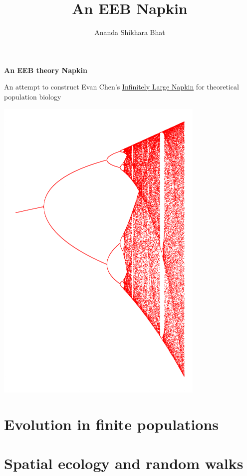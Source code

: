 \documentclass[12pt,twoside]{report}
\title{An EEB Napkin}
\author{Ananda Shikhara Bhat}
\begin{document}
	\begin{titlepage}
		\begin{center}
			\vspace*{-1.5cm}
			
			\Huge
			\textbf{An EEB theory Napkin}
			
			\vspace{0.5cm}
			\Large
			An attempt to construct Evan Chen's \href{https://web.evanchen.cc/napkin.html}{Infinitely Large Napkin} for theoretical population biology
			
			\noindent\includegraphics[width=0.75\textwidth]{figures/logistic_bifurcation.png}
			
			\large
			\vspace{-0.2cm}
		\end{center}
	\end{titlepage}
	\tableofcontents
	\part{Evolution in finite populations}
	
	\part{Spatial ecology and random walks}
	
	
\end{document}
